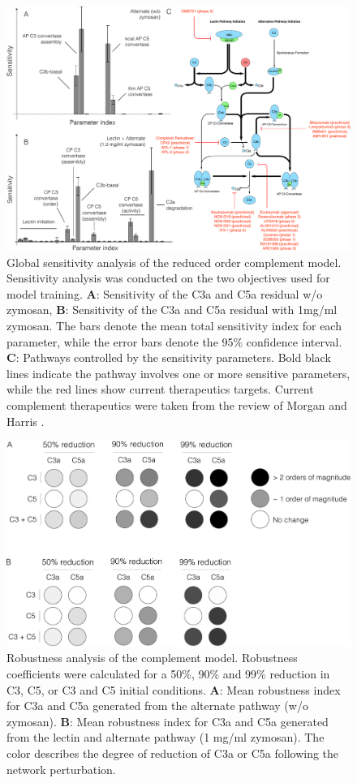 \documentclass[12pt]{article}
\begin{document}
\begin{figure}[h]
\centering
\includegraphics[width=1.1\textwidth]{./figs/Figure4_Sensitivity_v3.pdf}
\caption{Global sensitivity analysis of the reduced order complement model.
Sensitivity analysis was conducted on the two objectives used for model training.
\textbf{A}: Sensitivity of the C3a and C5a residual w/o zymosan,
\textbf{B}: Sensitivity of the C3a and C5a residual with 1mg/ml zymosan.
The bars denote the mean total sensitivity index for each parameter, while the error bars denote the 95\% confidence interval.
\textbf{C}: Pathways controlled by the sensitivity parameters.
Bold black lines indicate the pathway involves one or more sensitive parameters, while the red lines show current therapeutics targets.
Current complement therapeutics were taken from the review of Morgan and Harris \cite{morgan2015complement}. }\label{fig-SA}
\end{figure}

\begin{figure}[h]
\centering
\includegraphics[width=1.0\textwidth]{./figs/Figure5_RobustnessAnalysis_v3.pdf}
\caption{Robustness analysis of the complement model.
Robustness coefficients were calculated for a 50\%, 90\% and 99\% reduction in C3, C5, or C3 and C5 initial conditions.
\textbf{A}: Mean robustness index for C3a and C5a generated from the alternate pathway (w/o zymosan).
\textbf{B}: Mean robustness index for C3a and C5a generated from the lectin and alternate pathway (1 mg/ml zymosan).
The color describes the degree of reduction of C3a or C5a following the network perturbation.
}\label{fig-robustness-analysis}
\end{figure}
\end{document}
